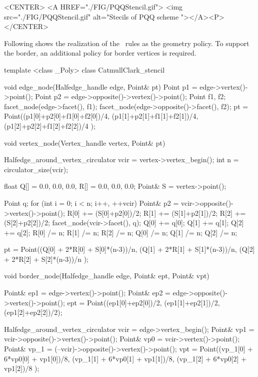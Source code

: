 \begin{ccHtmlOnly}
  <CENTER>
  <A HREF="./FIG/PQQStencil.gif">
     <img src="./FIG/PQQStencil.gif" alt="Stecils of PQQ scheme "></A><P>
  </CENTER>
\end{ccHtmlOnly}

Following shows the realization of the \CC\ rules as the geometry policy.
To support the border, an additional policy for border vertices is 
required.
\begin{ccExampleCode}
template <class _Poly>
class CatmullClark_stencil {
   void edge_node(Halfedge_handle edge, Point& pt) {
    Point p1 = edge->vertex()->point();
    Point p2 = edge->opposite()->vertex()->point();
    Point f1, f2;
    facet_node(edge->facet(), f1);
    facet_node(edge->opposite()->facet(), f2);
    pt = Point((p1[0]+p2[0]+f1[0]+f2[0])/4,
               (p1[1]+p2[1]+f1[1]+f2[1])/4,
               (p1[2]+p2[2]+f1[2]+f2[2])/4 );
  }
 
  void vertex_node(Vertex_handle vertex, Point& pt) {
    Halfedge_around_vertex_circulator vcir = vertex->vertex_begin();
    int n = circulator_size(vcir);    

    float Q[] = {0.0, 0.0, 0.0}, R[] = {0.0, 0.0, 0.0};
    Point& S = vertex->point();
    
    Point q;
    for (int i = 0; i < n; i++, ++vcir) {
      Point& p2 = vcir->opposite()->vertex()->point();
      R[0] += (S[0]+p2[0])/2;
      R[1] += (S[1]+p2[1])/2;
      R[2] += (S[2]+p2[2])/2;
      facet_node(vcir->facet(), q);
      Q[0] += q[0];      
      Q[1] += q[1];      
      Q[2] += q[2];
    }
    R[0] /= n;    R[1] /= n;    R[2] /= n;
    Q[0] /= n;    Q[1] /= n;    Q[2] /= n;
      
    pt = Point((Q[0] + 2*R[0] + S[0]*(n-3))/n,
               (Q[1] + 2*R[1] + S[1]*(n-3))/n,
               (Q[2] + 2*R[2] + S[2]*(n-3))/n );
  }

  void border_node(Halfedge_handle edge, Point& ept, Point& vpt) {
    Point& ep1 = edge->vertex()->point();
    Point& ep2 = edge->opposite()->vertex()->point();
    ept = Point((ep1[0]+ep2[0])/2, (ep1[1]+ep2[1])/2, (ep1[2]+ep2[2])/2);

    Halfedge_around_vertex_circulator vcir = edge->vertex_begin();
    Point& vp1  = vcir->opposite()->vertex()->point();
    Point& vp0  = vcir->vertex()->point();
    Point& vp_1 = (--vcir)->opposite()->vertex()->point();
    vpt = Point((vp_1[0] + 6*vp0[0] + vp1[0])/8,
                (vp_1[1] + 6*vp0[1] + vp1[1])/8,
                (vp_1[2] + 6*vp0[2] + vp1[2])/8 );
  }
}
\end{ccExampleCode}

